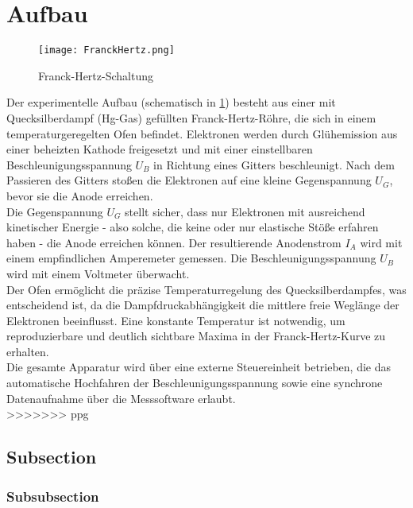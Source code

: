 \section{Aufbau}

\begin{figure}[H]
    \centering
    \texttt{[image: FranckHertz.png]}
    \caption{Franck-Hertz-Schaltung \cite{FranckHertzHg}} 
    \label{fig:FrankHertzSchaltung}    
\end{figure}

Der experimentelle Aufbau (schematisch in \cref{fig:FrankHertzSchaltung}) besteht aus einer mit Quecksilberdampf (Hg-Gas) gefüllten Franck-Hertz-Röhre, die sich in einem temperaturgeregelten Ofen befindet. Elektronen werden durch Glühemission aus einer beheizten Kathode freigesetzt und mit einer einstellbaren Beschleunigungsspannung $ U_B $ in Richtung eines Gitters beschleunigt. Nach dem Passieren des Gitters stoßen die Elektronen auf eine kleine Gegenspannung $ U_G $, bevor sie die Anode erreichen.
\vspace{0.3cm}\\
Die Gegenspannung $ U_G $ stellt sicher, dass nur Elektronen mit ausreichend kinetischer Energie - also solche, die keine oder nur elastische Stöße erfahren haben - die Anode erreichen können. Der resultierende Anodenstrom $ I_A $ wird mit einem empfindlichen Amperemeter gemessen. Die Beschleunigungsspannung $ U_B $ wird mit einem Voltmeter überwacht.
\vspace{0.3cm}\\
Der Ofen ermöglicht die präzise Temperaturregelung des Quecksilberdampfes, was entscheidend ist, da die Dampfdruckabhängigkeit die mittlere freie Weglänge der Elektronen beeinflusst. Eine konstante Temperatur ist notwendig, um reproduzierbare und deutlich sichtbare Maxima in der Franck-Hertz-Kurve zu erhalten.
\vspace{0.3cm}\\
Die gesamte Apparatur wird über eine externe Steuereinheit betrieben, die das automatische Hochfahren der Beschleunigungsspannung sowie eine synchrone Datenaufnahme über die Messsoftware erlaubt.
\vspace{0.3cm}\\

>>>>>>> ppg
\subsection{Subsection}
\subsubsection{Subsubsection}
